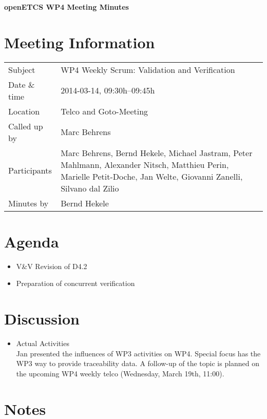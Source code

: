 \documentclass[a4paper, 11pt]{article}
\begin{document}
{\begin{center}\huge\bf openETCS WP4 Meeting Minutes\end{center}}
\section{Meeting Information}

\renewcommand{\arraystretch}{1.5}
\begin{supertabular}{m{.2\textwidth}m{.8\textwidth}}
Subject & WP4 Weekly Scrum: Validation and Verification\\
Date \& time & 2014-03-14, 09:30h--09:45h\\
Location & Telco and Goto-Meeting\\
Called up by & Marc Behrens\\
Participants &
Marc Behrens,
Bernd Hekele,
Michael Jastram,
Peter Mahlmann,
Alexander Nitsch,
Matthieu Perin,
Marielle Petit-Doche,
Jan Welte,
Giovanni Zanelli,
Silvano dal Zilio
\\

Minutes by & Bernd Hekele\\

\end{supertabular}
\renewcommand{\arraystretch}{1.0}


\section{{Agenda}}
\begin{itemize}
\item V\&V Revision of D4.2
\item Preparation of concurrent verification
\end{itemize}

\section{Discussion}

\begin{itemize}
\item Actual Activities\\
Jan presented the influences of WP3 activities on WP4. Special focus has the WP3 way to provide traceability data. A follow-up of the topic is planned on the upcoming WP4 weekly telco (Wednesday, March 19th, 11:00).

\end{itemize}

\section{Notes}
\end{document}
